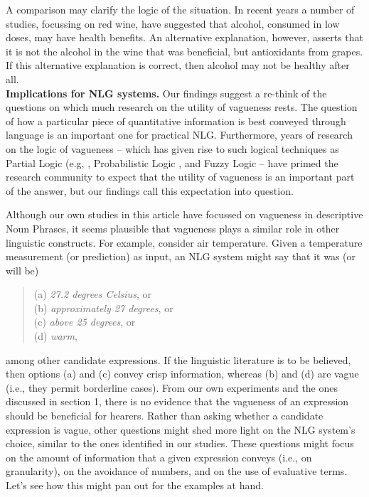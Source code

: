 \documentclass[%
man,		%
floatsintext,%
apacite%
]{apa6}
\begin{document}
A comparison may clarify the logic of the situation. In recent years a number of studies, focussing on red wine, have suggested that alcohol, consumed in low doses, may have health benefits. An alternative explanation, however, asserts that it is not the alcohol in the wine that was beneficial, but antioxidants from grapes. If this alternative explanation is correct, then alcohol may not be healthy after all.\\[2ex]
%
{\bf Implications for NLG systems.} Our findings suggest a re-think of the questions on which much research on the utility of vagueness rests. The question of how a particular piece of quantitative information is best conveyed through language is an important one for practical NLG. Furthermore, years of research on the logic of vagueness -- which has given rise to such logical techniques as Partial Logic (e.g, \cite{Fine}, Probabilistic Logic \cite{Edgington}, and Fuzzy Logic \cite{Zadeh} -- have primed the research community to expect that the utility of vagueness is an important part of the answer, but our findings call this expectation into question. 

Although our own studies in this article have focussed on vagueness in descriptive Noun Phrases, it seems plausible that vagueness plays a similar role in other linguistic constructs. For example, consider air temperature. Given a temperature measurement (or prediction) as input, an NLG system might say that it was (or will be)
%
\begin{quote}
(a) {\em 27.2 degrees Celsius}, or\\
(b) {\em approximately 27 degrees}, or\\
(c) {\em above 25 degrees}, or\\
(d) {\em warm}, 
\end{quote}
%
among other candidate expressions. If the linguistic literature is to be believed, then options (a) and (c) convey crisp information, whereas (b) and (d) are vague (i.e., they permit borderline cases). From our own experiments and the ones discussed in section 1, there is no evidence that the vagueness of an expression should be beneficial for hearers. Rather than asking whether a candidate expression is vague, other questions might shed more light on the NLG system's choice, similar to the ones identified in our studies. These questions might focus on the amount of information that a given expression conveys (i.e., on granularity), on the avoidance of numbers, and on the use of evaluative terms. Let's see how this might pan out for the examples at hand.
\end{document}
